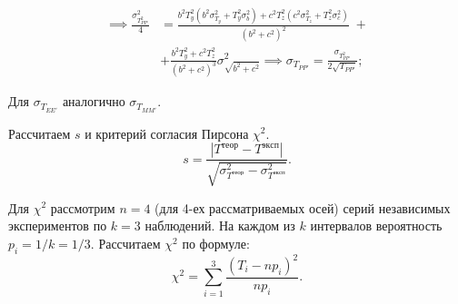 \documentclass[a4paper, 12pt]{article}
\begin{document}
        \begin{equation*}
            \begin{aligned}
            \implies \frac{\sigma_{T_{PP'}^2}^2}{4} & =
            \frac{
            b^2T_y^2(b^2\sigma_{T_y}^2 + T_y^2\sigma_{b}^2) +
            c^2T_z^2(c^2\sigma_{T_z}^2 + T_z^2\sigma_{c}^2)
            }
            {(b^2+c^2)^2} \;+ \\
            & + 
            \frac{b^2T_y^2+c^2T_z^2}{(b^2+c^2)^3}\sigma_{\sqrt{b^2+c^2}}^2
            \implies \sigma_{T_{PP'}} = \frac{\sigma_{T_{PP'}^2}}{2\sqrt{T_{PP'}}};
            \end{aligned}
        \end{equation*}

        Для $\sigma_{T_{EE'}}$ аналогично $\sigma_{T_{MM'}}$.
        
        Рассчитаем $s$ и критерий согласия Пирсона $\chi^2$.
        \begin{equation*}
            s = \frac{|T^{теор} - T^{эксп}|}{\sqrt{\sigma_{T^{теор}}^2 - \sigma_{T^{эксп}}^2}}.
        \end{equation*}

        Для $\chi^2$ рассмотрим $n = 4$ (для 4-ех рассматриваемых осей) серий независимых экспериментов по $k = 3$ наблюдений. На каждом из $k$ интервалов вероятность $p_i = 1/k = 1/3$. Рассчитаем $\chi^2$ по формуле:
        \begin{equation*}
            \chi^2 = \sum_{i=1}^{3} \frac{(T_i - np_i)^2}{np_i}.
        \end{equation*}
\end{document}
